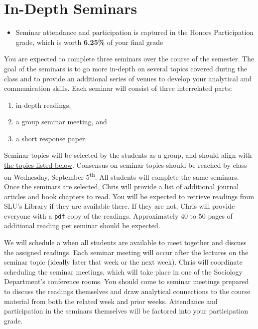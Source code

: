 \documentclass[]{book}
\providecommand{\tightlist}{%
  \setlength{\itemsep}{0pt}\setlength{\parskip}{0pt}}
\newenvironment{rmdblock}[1]
  {\begin{shaded*}
  \begin{itemize}
  \renewcommand{\labelitemi}{
    \raisebox{-.7\height}[0pt][0pt]{
      {\setkeys{Gin}{width=3em,keepaspectratio}\texttt{[image: images/\#1]}}
    }
  }
  \item
  }
  {
  \end{itemize}
  \end{shaded*}
  }
\newenvironment{rmdtip}
  {\begin{rmdblock}{tip}}
  {\end{rmdblock}}
\theoremstyle{definition}
\theoremstyle{definition}
\theoremstyle{definition}
\theoremstyle{remark}
\begin{document}
\hypertarget{in-depth-seminars}{%
\section{In-Depth Seminars}\label{in-depth-seminars}}

\begin{rmdtip}
Seminar attendance and participation is captured in the Honors
Participation grade, which is worth \textbf{6.25\%} of your final grade
\end{rmdtip}

You are expected to complete three seminars over the course of the
semester. The goal of the seminars is to go more in-depth on several
topics covered during the class and to provide an additional series of
venues to develop your analytical and communication skills. Each seminar
will consist of three interrelated parts:

\begin{enumerate}
\def\labelenumi{\arabic{enumi}.}
\tightlist
\item
  in-depth readings,
\item
  a group seminar meeting, and
\item
  a short response paper.
\end{enumerate}

Seminar topics will be selected by the students as a group, and should
align with \href{/honors-seminar-topics.html}{the topics listed below}.
Consensus on seminar topics should be reached by class on Wednesday,
September 5\textsuperscript{th}. All students will complete the same
seminars. Once the seminars are selected, Chris will provide a list of
additional journal articles and book chapters to read. You will be
expected to retrieve readings from SLU's Library if they are available
there. If they are not, Chris will provide everyone with a \texttt{pdf}
copy of the readings. Approximately 40 to 50 pages of additional reading
per seminar should be expected.

We will schedule a when all students are available to meet together and
discuss the assigned readings. Each seminar meeting will occur after the
lectures on the seminar topic (ideally later that week or the next
week). Chris will coordinate scheduling the seminar meetings, which will
take place in one of the Sociology Department's conference rooms. You
should come to seminar meetings prepared to discuss the readings
themselves and draw analytical connections to the course material from
both the related week and prior weeks. Attendance and participation in
the seminars themselves will be factored into your participation grade.
\end{document}
